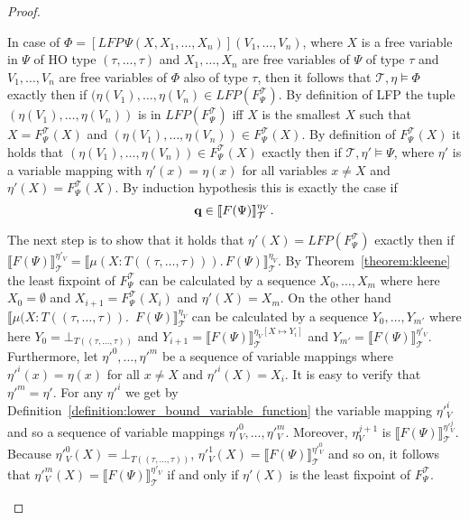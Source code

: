 \begin{proof}
\begin{compactitem}
        \item In case of $\Phi = [LFP\,\Psi(X, X_1, \dots, X_n)](V_1, \dots, V_n)$, where $X$ is a
        free variable in $\Psi$ of HO type $(\tau, \dots, \tau)$ and $X_1, \dots, X_n$ are free
        variables of $\Psi$ of type $\tau$ and $V_1, \dots, V_n$ are free variables of $\Phi$ also of type $\tau$, then
        it follows that $\mathcal{T}, \eta \models \Phi$ exactly then if $(\eta(V_1), \dots, \eta(V_n) \in LFP
        (F_\Psi^\mathcal{T})$. By definition of LFP the tuple $(\eta(V_1), \dots, \eta(V_n))$ is in
        $LFP(F_\Psi^\mathcal{T})$ iff $X$ is the smallest $X$ such that $X = F_\Psi^\mathcal{T}(X)$ and $(\eta(V_1), \dots, \eta(V_n)) \in
        F_\Psi^\mathcal{T}(X)$. By definition of $F_\Psi^\mathcal{T}(X)$ it holds that $(\eta
        (V_1), \dots, \eta(V_n)) \in F_\Psi^\mathcal{T}(X)$ exactly then if $\mathcal{T}, \eta' 
        \models \Psi$, where $\eta'$ is a variable mapping with $\eta'(x) = \eta(x)$ for all variables $x \neq X$ and $\eta'(X) = F_\Psi^\mathcal{T}(X)$. By induction hypothesis this is exactly the case if
        \[\emph{q} \in \llbracket  F(\Psi)
        \rrbracket^{\eta_V}_\mathcal{T}.\]

The next step is to show that it holds that $\eta'(X) = LFP(F^\mathcal{T}_\Psi)$ exactly then if $\llbracket F(\Psi) \rrbracket^{\eta'_V}_\mathcal{T} = \llbracket \mu (X \colon T((\tau, \dots, \tau))).\,F(\Psi)\rrbracket_\mathcal{T}^{\eta_V}$. 
        By Theorem~\ref{theorem:kleene} the least fixpoint of $F^\mathcal{T}_\Psi$ can be calculated by a sequence $X_0, \dots, X_m$ where here $X_0 = \emptyset$ and $X_{i+1} 
        = F_\Psi^\mathcal{T}(X_i)$ and $\eta'(X) = X_m$. On the other hand $\llbracket \mu (X \colon T((\tau, \dots, \tau)).$ $\,F(\Psi)\rrbracket_\mathcal{T}^{\eta_V}$ can be calculated by a sequence 
         $Y_0, \dots, Y_{m'}$ where here $Y_0 = \bot_{T((\tau, \dots, \tau))}$ and $Y_{i+1} = \llbracket F(\Psi)\rrbracket_\mathcal{T}^{\eta_V[X \mapsto Y_i]}$ and $Y_{m'} = \llbracket F(\Psi)\rrbracket_\mathcal{T}^{\eta'_V}$. Furthermore, let $\eta'^0, \dots, \eta'^m$ be a sequence of variable mappings where $\eta'^i(x) = \eta(x)$ for all $x \neq X$ and $\eta'^i(X) = X_i$. It is easy to verify that $\eta'^m = \eta'$. For any $\eta'^i$ we get by Definition~\ref{definition:lower_bound_variable_function} the variable mapping $\eta'^i_V$ and so a sequence of variable mappings $\eta'^0_V, \dots, \eta'^m_V$. Moreover, $\eta^{j+1}_V$ is $\llbracket F(\Psi)\rrbracket_\mathcal{T}^{\eta'^j_V}$. Because $\eta'^0_V(X) = \bot_{T((\tau, \dots, \tau))}$, $\eta'^1_V(X) =\llbracket F(\Psi)\rrbracket_\mathcal{T}^{\eta'^0_V}$ and so on, it follows that $\eta'^m_V(X) = \llbracket F(\Psi) \rrbracket^{\eta'_V}_\mathcal{T}$ if and only if $\eta'(X)$ is the least fixpoint of $F^\mathcal{T}_\Psi$.
        

\end{compactitem}
\end{proof}
